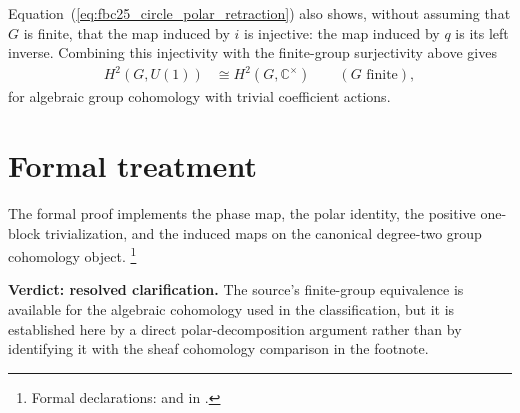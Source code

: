 \documentclass{article}
\begin{document}
Equation~(\ref{eq:fbc25_circle_polar_retraction}) also shows, without assuming
that $G$ is finite, that the map induced by $i$ is injective: the map induced
by $q$ is its left inverse.  Combining this injectivity with the finite-group
surjectivity above gives
\begin{align}
    H^2(G,U(1))
     & \cong H^2(G,\mathbb C^\times)
    \qquad (G\text{ finite}),
    \label{eq:fbc25_circle_h2_equivalence}
\end{align}
for algebraic group cohomology with trivial coefficient actions.

\section{Formal treatment}

The formal proof implements the phase map, the polar identity, the positive
one-block trivialization, and the induced maps on the canonical degree-two
group cohomology object.
\footnote{Formal declarations:
    and  in
    .}

\textbf{Verdict: resolved clarification.}
The source's finite-group equivalence is available for the algebraic
cohomology used in the classification, but it is established here by a direct
polar-decomposition argument rather than by identifying it with the sheaf
cohomology comparison in the footnote.



\end{document}
